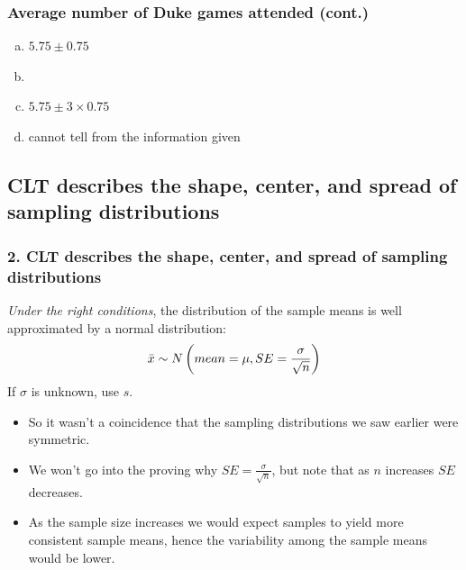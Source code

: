\documentclass[slidestop,compress,mathserif,12pt,t,professionalfonts,xcolor=table]{beamer}
\newcommand{\solnMult}[1]{
\only<1>{#1}
\only<2->{\red{\textbf{#1}}}
}
\newcommand{\soln}[1]{\textit{#1}}
\begin{document}

\begin{frame}[fragile]
\frametitle{Average number of Duke games attended (cont.)}


\begin{enumerate}[(a)]
\item $5.75 \pm 0.75$
\item \solnMult{$5.75 \pm 2 \times 0.75$} \soln{}
\item $5.75 \pm 3 \times 0.75$
\item cannot tell from the information given
\end{enumerate}

\end{frame}


\subsection{CLT describes the shape, center, and spread of sampling distributions}
\label{mi2}


\begin{frame}
\frametitle{2. CLT describes the shape, center, and spread of sampling distributions}

\emph{Under the right conditions}, the distribution of the sample means is well
approximated by a normal distribution:
\[ \bar{x} \sim N \left(  mean = \mu, SE = \frac{\sigma}{\sqrt{n}}  \right) \]
If $\sigma$ is unknown, use $s$.

\pause

\begin{itemize}

\item So it wasn't a coincidence that the sampling distributions we saw earlier were symmetric.

\item We won't go into the proving why $SE =  \frac{\sigma}{\sqrt{n}}$, but note that as $n$ increases $SE$ decreases. 

\item As the sample size increases we would expect samples to yield more consistent sample means, hence the variability among the sample means would be lower.

\end{itemize}

\end{frame}
\end{document}
